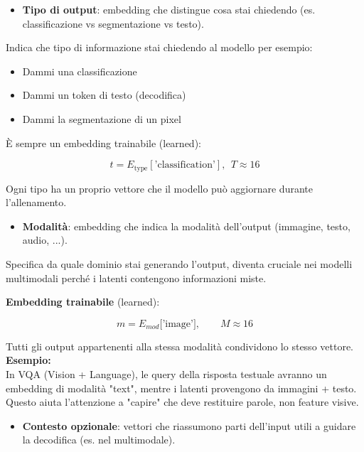 \documentclass[
  11pt,
]{article}
\begin{document}
\begin{itemize}
\item
  \textbf{Tipo di output}: embedding che distingue cosa stai chiedendo
  (es. classificazione vs segmentazione vs testo).
\end{itemize}


Indica che tipo di informazione stai chiedendo al modello per esempio:


\begin{itemize}
\item Dammi una classificazione
\item Dammi un token di testo (decodifica)
\item Dammi la segmentazione di un pixel
\end{itemize}

È sempre un embedding trainabile (learned):

\[t = E_{\text{type}}\left\lbrack \text{'classification'} \right\rbrack,\ \ T \approx 16\]

Ogni tipo ha un proprio vettore che il modello può aggiornare durante
l'allenamento.


\begin{itemize}
\item
  \textbf{Modalità}: embedding che indica la modalità
  dell'output (immagine, testo, audio, ...).
\end{itemize}

Specifica da quale dominio stai generando l'output, diventa cruciale nei
modelli multimodali perché i latenti contengono informazioni miste.

\textbf{Embedding trainabile} (learned):

\[m = E_{mod}\lbrack\text{'image'}\rbrack,\ \ \ \ \ \ \ \ \ M \approx 16\]

Tutti gli output appartenenti alla stessa modalità condividono lo stesso
vettore.\\
\textbf{Esempio:}\\
In VQA (Vision + Language), le query della risposta testuale avranno un
embedding di modalità "text", mentre i latenti provengono da immagini +
testo.\\
Questo aiuta l'attenzione a "capire" che deve restituire
parole, non feature visive.

\begin{itemize}
\item
  \textbf{Contesto opzionale}: vettori che riassumono parti
  dell'input utili a guidare la decodifica (es. nel
  multimodale).
\end{itemize}
\end{document}

